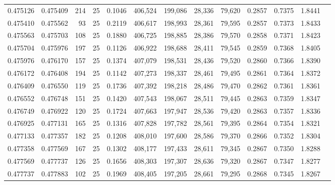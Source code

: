 \begin{tabular}{rrrrrrrrrrrrr}
0.475126 & 0.475409 &   214 &  25 &                                     0.1046 & 406,524 & 199,086 &  28,336 &  79,620 & 0.2857 & 0.7375 & 1.8441 \\
0.475410 & 0.475562 &    93 &  25 &                                     0.2119 & 406,617 & 198,993 &  28,361 &  79,595 & 0.2857 & 0.7373 & 1.8433 \\
0.475563 & 0.475703 &   108 &  25 &                                     0.1880 & 406,725 & 198,885 &  28,386 &  79,570 & 0.2858 & 0.7371 & 1.8423 \\
0.475704 & 0.475976 &   197 &  25 &                                     0.1126 & 406,922 & 198,688 &  28,411 &  79,545 & 0.2859 & 0.7368 & 1.8405 \\
0.475976 & 0.476170 &   157 &  25 &                                     0.1374 & 407,079 & 198,531 &  28,436 &  79,520 & 0.2860 & 0.7366 & 1.8390 \\
0.476172 & 0.476408 &   194 &  25 &                                     0.1142 & 407,273 & 198,337 &  28,461 &  79,495 & 0.2861 & 0.7364 & 1.8372 \\
0.476409 & 0.476550 &   119 &  25 &                                     0.1736 & 407,392 & 198,218 &  28,486 &  79,470 & 0.2862 & 0.7361 & 1.8361 \\
0.476552 & 0.476748 &   151 &  25 &                                     0.1420 & 407,543 & 198,067 &  28,511 &  79,445 & 0.2863 & 0.7359 & 1.8347 \\
0.476749 & 0.476922 &   120 &  25 &                                     0.1724 & 407,663 & 197,947 &  28,536 &  79,420 & 0.2863 & 0.7357 & 1.8336 \\
0.476925 & 0.477131 &   165 &  25 &                                     0.1316 & 407,828 & 197,782 &  28,561 &  79,395 & 0.2864 & 0.7354 & 1.8321 \\
0.477133 & 0.477357 &   182 &  25 &                                     0.1208 & 408,010 & 197,600 &  28,586 &  79,370 & 0.2866 & 0.7352 & 1.8304 \\
0.477358 & 0.477569 &   167 &  25 &                                     0.1302 & 408,177 & 197,433 &  28,611 &  79,345 & 0.2867 & 0.7350 & 1.8288 \\
0.477569 & 0.477737 &   126 &  25 &                                     0.1656 & 408,303 & 197,307 &  28,636 &  79,320 & 0.2867 & 0.7347 & 1.8277 \\
0.477737 & 0.477883 &   102 &  25 &                                     0.1969 & 408,405 & 197,205 &  28,661 &  79,295 & 0.2868 & 0.7345 & 1.8267 \\

\end{tabular}
